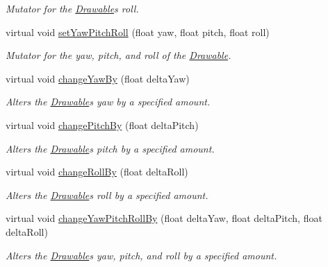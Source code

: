 \begin{DoxyCompactItemize}
\begin{DoxyCompactList}\small\item\em Mutator for the \hyperlink{classtsgl_1_1_drawable}{Drawable}\textquotesingle{}s roll. \end{DoxyCompactList}\item 
virtual void \hyperlink{classtsgl_1_1_drawable_a127514372e6bd4b652fd384e27a944de}{set\+Yaw\+Pitch\+Roll} (float yaw, float pitch, float roll)
\begin{DoxyCompactList}\small\item\em Mutator for the yaw, pitch, and roll of the \hyperlink{classtsgl_1_1_drawable}{Drawable}. \end{DoxyCompactList}\item 
virtual void \hyperlink{classtsgl_1_1_drawable_a3a57e4a919a30931942d5f5f20f5647c}{change\+Yaw\+By} (float delta\+Yaw)
\begin{DoxyCompactList}\small\item\em Alters the \hyperlink{classtsgl_1_1_drawable}{Drawable}\textquotesingle{}s yaw by a specified amount. \end{DoxyCompactList}\item 
virtual void \hyperlink{classtsgl_1_1_drawable_a5cf7b8412046388eec3e518e99991646}{change\+Pitch\+By} (float delta\+Pitch)
\begin{DoxyCompactList}\small\item\em Alters the \hyperlink{classtsgl_1_1_drawable}{Drawable}\textquotesingle{}s pitch by a specified amount. \end{DoxyCompactList}\item 
virtual void \hyperlink{classtsgl_1_1_drawable_add43efbe60acaab91cf425facc68363a}{change\+Roll\+By} (float delta\+Roll)
\begin{DoxyCompactList}\small\item\em Alters the \hyperlink{classtsgl_1_1_drawable}{Drawable}\textquotesingle{}s roll by a specified amount. \end{DoxyCompactList}\item 
virtual void \hyperlink{classtsgl_1_1_drawable_af8541a8069354d047580676c51fa6942}{change\+Yaw\+Pitch\+Roll\+By} (float delta\+Yaw, float delta\+Pitch, float delta\+Roll)
\begin{DoxyCompactList}\small\item\em Alters the \hyperlink{classtsgl_1_1_drawable}{Drawable}\textquotesingle{}s yaw, pitch, and roll by a specified amount. \end{DoxyCompactList}\item 

\end{DoxyCompactItemize}
